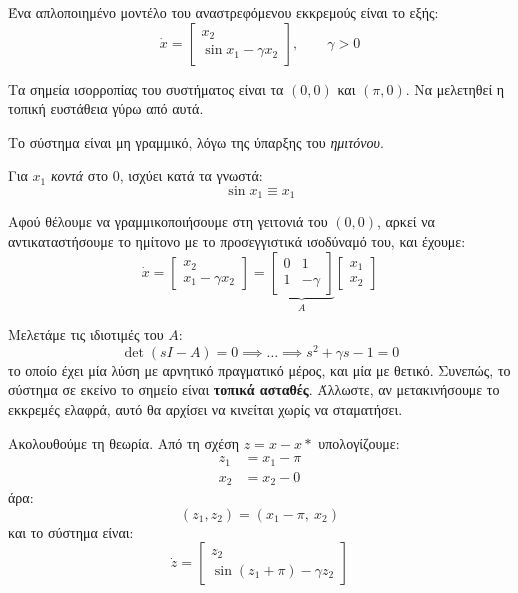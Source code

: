 \documentclass[11pt,a4paper,notitlepage,fleqn]{article}
\begin{document}
\begin{exercise}[Παράδειγμα]
	Ένα απλοποιημένο μοντέλο του αναστρεφόμενου εκκρεμούς είναι το εξής:
	\[
	\dot x = \left[\begin{matrix}
	x_2 \\ \sin x_1 - γ x_2 \end{matrix}
	\right], \qquad γ > 0
	\]
	
	Τα σημεία ισορροπίας του συστήματος είναι τα \( (0,0) \) και
	\( (π,0) \). Να μελετηθεί
	η τοπική ευστάθεια γύρω από αυτά.
	
	Το σύστημα είναι μη γραμμικό, λόγω της ύπαρξης του \textit{ημιτόνου}.
	
	Για \( x_1 \) \textit{κοντά} στο 0, ισχύει κατά τα γνωστά:
	\[
	\sin x_1 \equiv x_1
	\]
	
	Αφού θέλουμε να γραμμικοποιήσουμε στη γειτονιά του \( (0,0) \), αρκεί
	να αντικαταστήσουμε το ημίτονο με το προσεγγιστικά ισοδύναμό του,
	και έχουμε:
	\[
	\dot x = \left[\begin{matrix}
	x_2 \\ x_1-γx_2
	\end{matrix}\right] = \underbrace{\left[\begin{matrix}
	0 & 1 \\ 1 & -\gamma
	\end{matrix}\right]}_A \left[\begin{matrix}
	x_1 \\ x_2
	\end{matrix}\right]
	\]
	
	Μελετάμε τις ιδιοτιμές του \( A \):
	\[
	\det(sI-A) = 0 \implies \dots \implies s^2 + \gamma s - 1 = 0
	\]
	το οποίο έχει μία λύση με αρνητικό πραγματικό μέρος, και μία με θετικό.
	Συνεπώς, το σύστημα σε εκείνο το σημείο είναι
	\textbf{τοπικά ασταθές}. Άλλωστε, αν μετακινήσουμε το εκκρεμές ελαφρά,
	αυτό θα αρχίσει να κινείται χωρίς να σταματήσει.
	
	Ακολουθούμε τη θεωρία. Από τη σχέση \( z = x-x* \) υπολογίζουμε:
	\begin{align*}
		z_1 &= x_1 - π \\
		x_2 &= x_2 - 0
	\end{align*}
	άρα: \[
	(z_1,z_2) = \left(x_1-π, \ x_2\right)
	\]
	και το σύστημα είναι:
	\[
	\dot z = \left[\begin{matrix}
	z_2 \\ \sin(z_1 + π) - \gamma z_2
	\end{matrix}\right]
	\]


\end{exercise}
\end{document}
